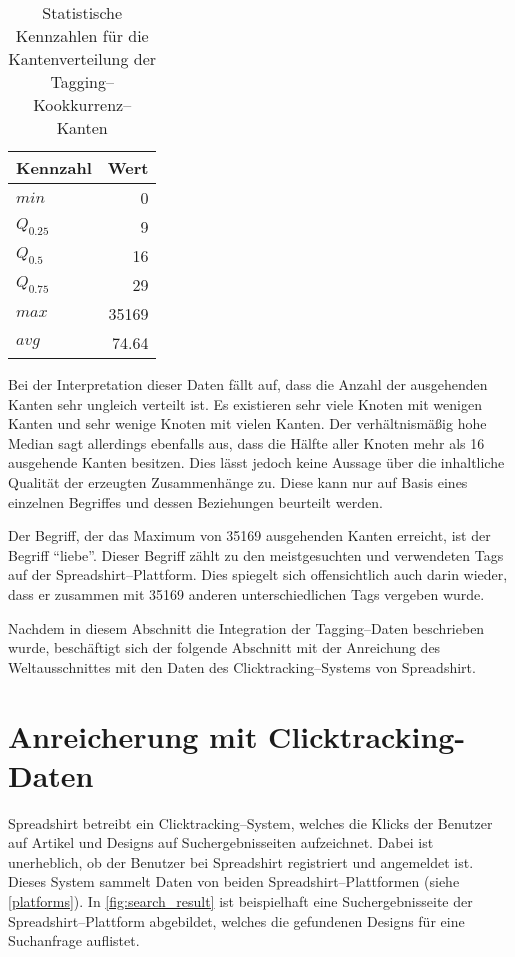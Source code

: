 \begin{table}[ht]
\centering
\begin{tabular}{lr}
    \toprule
    Kennzahl & Wert \\
    \midrule
    \(min\) & \num{0} \\
    \(Q_{0.25}\) & \num{9} \\
    \(Q_{0.5}\) & \num{16} \\
    \(Q_{0.75}\) & \num{29} \\
    \(max\) &  \num{35169} \\
    \(avg\) &  \num{74,64} \\
    \bottomrule
\end{tabular}
\caption{Statistische Kennzahlen für die Kantenverteilung der Tagging--Kookkurrenz--Kanten}
\label{tab:only_tags}
\end{table}

Bei der Interpretation dieser Daten fällt auf, dass die Anzahl der ausgehenden Kanten sehr ungleich verteilt ist. Es existieren sehr viele Knoten mit wenigen Kanten und sehr wenige Knoten mit vielen Kanten. Der verhältnismäßig hohe Median sagt allerdings ebenfalls aus, dass die Hälfte aller Knoten mehr als \num{16} ausgehende Kanten besitzen. Dies lässt jedoch keine Aussage über die inhaltliche Qualität der erzeugten Zusammenhänge zu. Diese kann nur auf Basis eines einzelnen Begriffes und dessen Beziehungen beurteilt werden.

Der Begriff, der das Maximum von \num{35169} ausgehenden Kanten erreicht, ist der Begriff ``liebe''. Dieser Begriff zählt zu den meistgesuchten und verwendeten Tags auf der Spreadshirt--Plattform. Dies spiegelt sich offensichtlich auch darin wieder, dass er zusammen mit \num{35169} anderen unterschiedlichen Tags vergeben wurde.

Nachdem in diesem Abschnitt die Integration der Tagging--Daten beschrieben wurde, beschäftigt sich der folgende Abschnitt mit der Anreichung des Weltausschnittes mit den Daten des Clicktracking--Systems von Spreadshirt.

\section{Anreicherung mit Clicktracking-Daten}
\label{clicktracking}

Spreadshirt betreibt ein Clicktracking--System, welches die Klicks der Benutzer auf Artikel und Designs auf Suchergebnisseiten aufzeichnet. Dabei ist unerheblich, ob der Benutzer bei Spreadshirt registriert und angemeldet ist. Dieses System sammelt Daten von beiden Spreadshirt--Plattformen (siehe \cref{platforms}). In \cref{fig:search_result} ist beispielhaft eine Suchergebnisseite der Spreadshirt--Plattform abgebildet, welches die gefundenen Designs für eine Suchanfrage auflistet.

